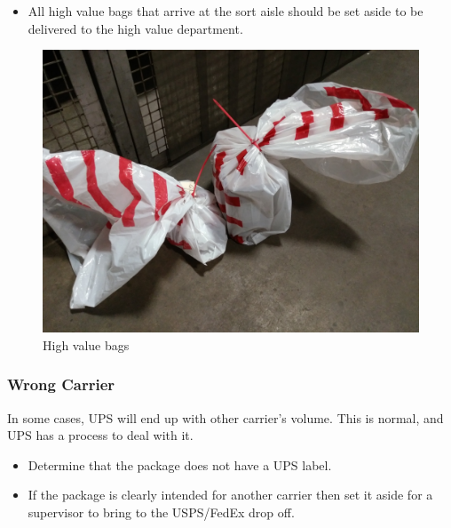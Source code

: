 \documentclass[12pt]{article}
\begin{document}
\begin{itemize}
    \item All high value bags that arrive at the sort aisle should be set aside to be delivered to the high value department.
\end{itemize}

\begin{figure}[H]
    \centering
    \includegraphics[width=0.4\linewidth]{20171222_022332}
    \caption{High value bags}
\end{figure}

\subsubsection{Wrong Carrier}
In some cases, UPS will end up with other carrier's volume. This is normal, and UPS has a process to deal with it.

\begin{itemize}
    \item Determine that the package does not have a UPS label.
    \item If the package is clearly intended for another carrier then set it aside for a supervisor to bring to the USPS/FedEx drop off.
\end{itemize}
\end{document}
